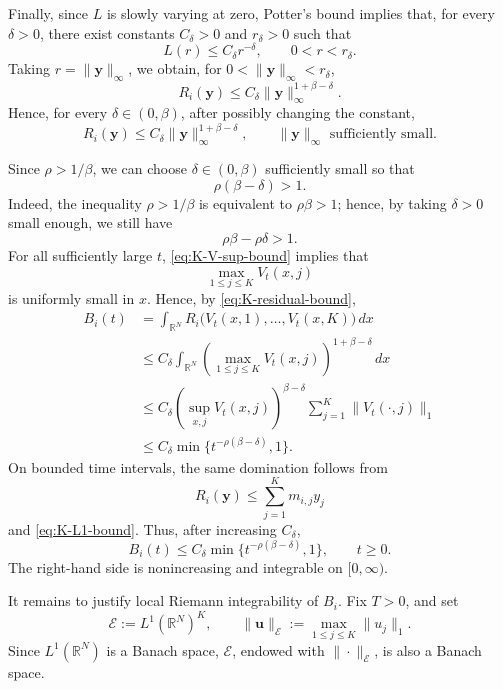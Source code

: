 \documentclass[reqno,final,11pt]{amsart}
\newcommand{\1}{\mathbbm{1}}
\theoremstyle{plain}
\theoremstyle{definition}
\theoremstyle{remark}
\begin{document}
Finally, since \(L\) is slowly varying at zero, Potter's bound implies that, for
every \(\delta>0\), there exist constants \(C_\delta>0\) and \(r_\delta>0\) such
that
\[
L(r)\le C_\delta r^{-\delta},
\qquad 0<r<r_\delta.
\]
Taking \(r=\|\mathbf y\|_\infty\), we obtain, for
\(0<\|\mathbf y\|_\infty<r_\delta\),
\[
R_i(\mathbf y)
\le
C_\delta
\|\mathbf y\|_\infty^{1+\beta-\delta}.
\]
Hence, for every \(\delta\in(0,\beta)\), after possibly changing the constant,
\begin{equation}\label{eq:K-residual-bound}
R_i(\mathbf y)
\le
C_\delta
\|\mathbf y\|_\infty^{1+\beta-\delta},
\qquad
\|\mathbf y\|_\infty \text{ sufficiently small}.
\end{equation}

Since \(\rho>1/\beta\), we can choose \(\delta\in(0,\beta)\) sufficiently small so
that
\[
\rho(\beta-\delta)>1.
\]
Indeed, the inequality \(\rho>1/\beta\) is equivalent to \(\rho\beta>1\); hence,
by taking \(\delta>0\) small enough, we still have
\[
\rho\beta-\rho\delta>1.
\]
For all sufficiently large \(t\), \eqref{eq:K-V-sup-bound} implies that
\[
\max_{1\le j\le K}V_t(x,j)
\]
is uniformly small in \(x\). Hence, by \eqref{eq:K-residual-bound},
\[
\begin{split}
B_i(t)
&=
\int_{\mathbb R^N}
R_i\bigl(V_t(x,1),\dots,V_t(x,K)\bigr)\,dx
\\
&\le
C_\delta
\int_{\mathbb R^N}
\left(\max_{1\le j\le K}V_t(x,j)\right)^{1+\beta-\delta}\,dx
\\
&\le
C_\delta
\left(\sup_{x,j}V_t(x,j)\right)^{\beta-\delta}
\sum_{j=1}^K\|V_t(\cdot,j)\|_1
\\
&\le
C_\delta
\min\{t^{-\rho(\beta-\delta)},1\}.
\end{split}
\]
On bounded time intervals, the same domination follows from
\[
R_i(\mathbf y)\le \sum_{j=1}^K m_{i,j}y_j
\]
and \eqref{eq:K-L1-bound}. Thus, after increasing \(C_\delta\),
\begin{equation}\label{eq:K-Bi-dominated}
B_i(t)
\le
C_\delta
\min\{t^{-\rho(\beta-\delta)},1\},
\qquad t\ge0.
\end{equation}
The right-hand side is nonincreasing and integrable on \([0,\infty)\).






It remains to justify local Riemann integrability of \(B_i\).
Fix \(T>0\), and set
\[
\mathcal E:=L^1(\mathbb R^N)^K,
\qquad
\|\mathbf u\|_{\mathcal E}:=
\max_{1\le j\le K}\|u_j\|_1 .
\]
Since \(L^1(\mathbb R^N)\) is a Banach space, \(\mathcal E\), endowed with
\(\|\cdot\|_{\mathcal E}\), is also a Banach space.
\end{document}
